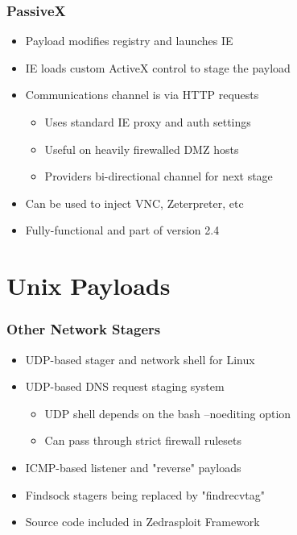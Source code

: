 \documentclass{beamer}
\newenvironment{sitemize}{\vspace{1mm}\begin{itemize}\itemsep 4pt\small}{\end{itemize}}
\begin{document}
\begin{frame}[t]
	\frametitle{PassiveX}
	\begin{sitemize}
		\item Payload modifies registry and launches IE
		\item IE loads custom ActiveX control to stage the payload
		\item Communications channel is via HTTP requests
		\begin{sitemize}
			\item Uses standard IE proxy and auth settings
			\item Useful on heavily firewalled DMZ hosts
			\item Providers bi-directional channel for next stage
		\end{sitemize}
	\end{sitemize}
	
	\begin{sitemize}
		\item Can be used to inject VNC, Zeterpreter, etc
		\item Fully-functional and part of version 2.4
	\end{sitemize}	
\end{frame}


\section{Unix Payloads}

\begin{frame}[t]
	\frametitle{Other Network Stagers}
	\begin{sitemize}
		\item UDP-based stager and network shell for Linux
		\item UDP-based DNS request staging system
		\begin{sitemize}
			\item UDP shell depends on the bash --noediting option
			\item Can pass through strict firewall rulesets
		\end{sitemize}
	\end{sitemize}
	
	\begin{sitemize}	
		\item ICMP-based listener and "reverse" payloads
		\item Findsock stagers being replaced by "findrecvtag"
		\item Source code included in Zedrasploit Framework
	\end{sitemize}	
\end{frame}
\end{document}
